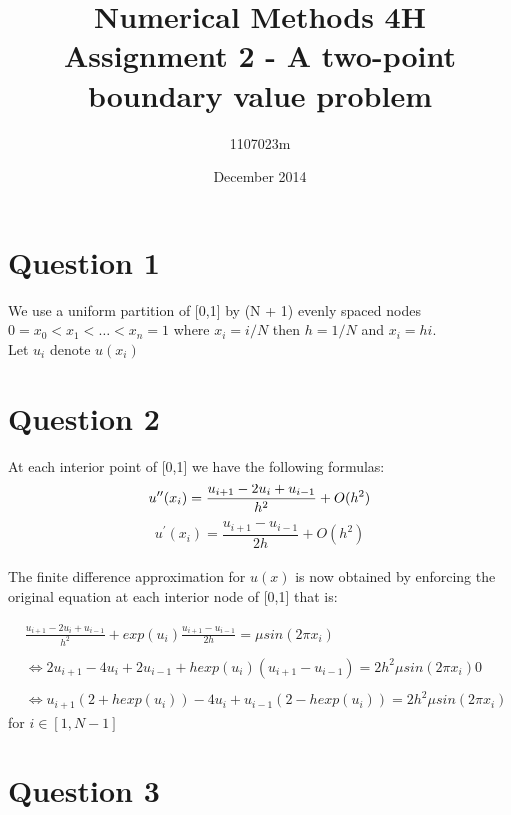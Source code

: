 \documentclass[fleqn]{report}
\begin{document}
\title{Numerical Methods 4H Assignment 2 - A two-point boundary value problem}
\author{1107023m}
\date{December 2014}
\maketitle

\section{Question 1}
We use a uniform partition of [0,1] by (N + 1) evenly spaced nodes \\
$0 = x_0 < x_1 < \dots < x_n = 1$ where $x_i = i/N$ then $h = 1/N$ and $x_i = hi.$\\
Let $u_i$ denote $u(x_i)$

\section{Question 2}

At each interior point of [0,1] we have the following formulas:
\begin{equation}
    u^{\prime\prime}(x_i) = \frac{u_{i+1} - 2u_i + u_{i-1}}{h^2} + O(h^2) \\
\end{equation}
\begin{equation}
    u^{\prime}(x_i) = \frac{u_{i+1} - u_{i-1}}{2h} + O(h^2)
\end{equation}
\\
The finite difference approximation for $u(x)$ is now obtained by enforcing the
original equation at each interior node of [0,1] that is:

\begin{equation} 
\begin{split}
&\frac{u_{i+1} - 2u_i + u_{i-1}}{h^2} + exp(u_i)\frac{u_{i+1} - u_{i-1}}{2h} = \mu sin(2 \pi x_i)\\\\
&\iff  2u_{i+1} - 4u_i + 2u_{i-1} + hexp(u_i)(u_{i+1} - u_{i-1}) =  2h^2\mu sin(2 \pi x_i)0\\\\
&\iff u_{i+1}(2 + hexp(u_i)) - 4u_i + u_{i-1}(2 - hexp(u_i)) = 2h^2\mu sin(2 \pi x_i)
\end{split}
\end{equation}
for $i \in [1, N - 1]$

\section{Question 3}
\end{document}
